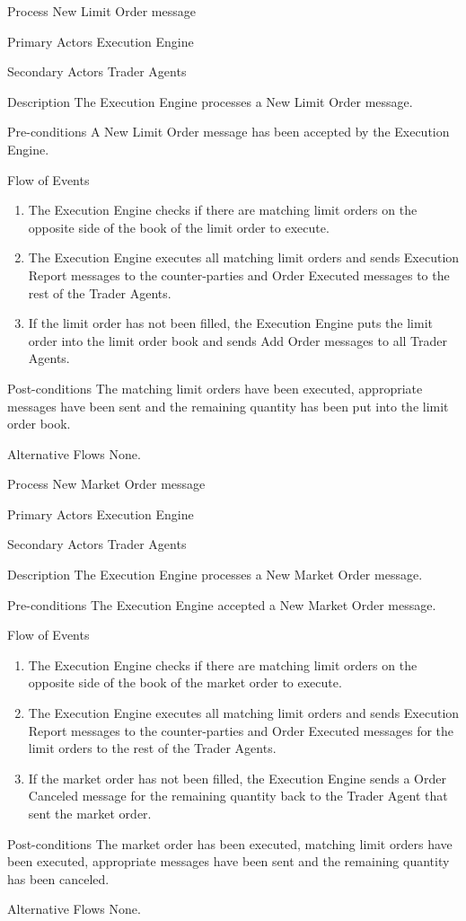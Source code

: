 \begin{usecase}{Process New Limit Order message}
\item[Primary Actors] Execution Engine
\item[Secondary Actors] Trader Agents
\item[Description] The Execution Engine processes a New Limit Order message.
\item[Pre-conditions] A New Limit Order message has been accepted by the Execution Engine.
\item[Flow of Events] 
\begin{enumerate}
\item The Execution Engine checks if there are matching limit orders on the opposite side of the book of the limit order to execute.
\item The Execution Engine executes all matching limit orders and sends Execution Report messages to the counter-parties and Order Executed messages to the rest of the Trader Agents.
\item If the limit order has not been filled, the Execution Engine puts the limit order into the limit order book and sends Add Order messages to all Trader Agents.
\end{enumerate}
\item[Post-conditions] The matching limit orders have been executed, appropriate messages have been sent and the remaining quantity has been put into the limit order book.
\item[Alternative Flows] None.
\end{usecase}

\begin{usecase}{Process New Market Order message}
\item[Primary Actors] Execution Engine
\item[Secondary Actors] Trader Agents
\item[Description] The Execution Engine processes a New Market Order message.
\item[Pre-conditions] The Execution Engine accepted a New Market Order message.
\item[Flow of Events] 
\begin{enumerate}
\item The Execution Engine checks if there are matching limit orders on the opposite side of the book of the market order to execute.
\item The Execution Engine executes all matching limit orders and sends Execution Report messages to the counter-parties and Order Executed messages for the limit orders to the rest of the Trader Agents.
\item If the market order has not been filled, the Execution Engine sends a Order Canceled message for the remaining quantity back to the Trader Agent that sent the market order.
\end{enumerate}
\item[Post-conditions] The market order has been executed, matching limit orders have been executed, appropriate messages have been sent and the remaining quantity has been canceled.
\item[Alternative Flows] None.
\end{usecase}

